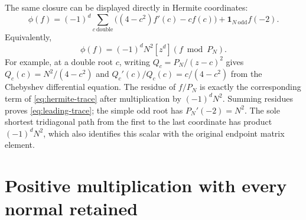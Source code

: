 The same closure can be displayed directly in Hermite coordinates:
\begin{equation}\label{eq:hermite-trace}
 \phi(f)=(-1)^d\sum_{c\ \mathrm{double}}
 \bigl((4-c^2)f'(c)-cf(c)\bigr)
 +\mathbf1_{N\ \mathrm{odd}}f(-2).
\end{equation}
Equivalently,
\begin{equation}\label{eq:leading-trace}
 \phi(f)=(-1)^dN^2[z^d](f\bmod P_N).
\end{equation}
For example, at a double root $c$, writing $Q_c=P_N/(z-c)^2$ gives
$Q_c(c)=N^2/(4-c^2)$ and $Q_c'(c)/Q_c(c)=c/(4-c^2)$ from the Chebyshev differential equation. The residue of $f/P_N$ is exactly the corresponding term of \eqref{eq:hermite-trace} after multiplication by $(-1)^dN^2$. Summing residues proves \eqref{eq:leading-trace}; the simple odd root has $P_N'(-2)=N^2$. The sole shortest tridiagonal path from the first to the last coordinate has product $(-1)^dN^2$, which also identifies this scalar with the original endpoint matrix element.

\section{Positive multiplication with every normal retained}

